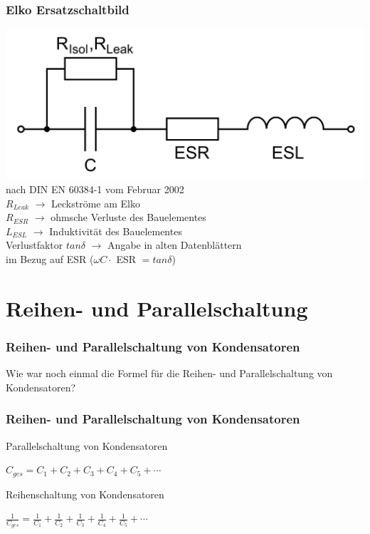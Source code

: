 \begin{frame}
  \frametitle{Elko Ersatzschaltbild}
  \begin{center}
    \includegraphics[width=.8\textwidth,height=.4\textheight,keepaspectratio]{a03/Elko-Ersatzschaltbild.png}
    {\tiny\hyperlink{refs}{\cite{wc}}\\
    nach DIN EN 60384-1 vom Februar 2002} \\[1em]

    $R_{Leak}$ $\rightarrow$ Leckströme am Elko\\
    $R_{ESR}$ $\rightarrow$ ohmsche Verluste des Bauelementes\\
    $L_{ESL}$ $\rightarrow$ Induktivität des Bauelementes\\
    Verlustfaktor $tan \delta$ $\rightarrow$ Angabe in alten Datenblättern \\im Bezug auf ESR ($\omega C \cdot$ ESR $= tan \delta$)
  \end{center}
\end{frame}


\section*{Reihen- und Parallelschaltung}

\begin{frame}
  \frametitle{Reihen- und Parallelschaltung von Kondensatoren}
  \begin{center}
    \huge Wie war noch einmal die Formel für die Reihen- und Parallelschaltung von Kondensatoren?
  \end{center}
\end{frame}

\begin{frame}
  \frametitle{Reihen- und Parallelschaltung von Kondensatoren}
  \begin{block}{Parallelschaltung von Kondensatoren}
    \begin{center}
      \huge{$C_{ges} = C_{1} + C_{2} + C_{3} + C_{4} + C_{5} + \cdots$}
    \end{center}
  \end{block}
  \pause
  \begin{block}{Reihenschaltung von Kondensatoren}
    \begin{center}
      \huge{$\frac{1}{C_{ges}} = \frac{1}{ C_{1}} + \frac{1}{C_{2}} + \frac{1}{C_{3}} + \frac{1}{C_{4}} + \frac{1}{C_{5}} + \cdots$}
    \end{center}
  \end{block}
\end{frame}

